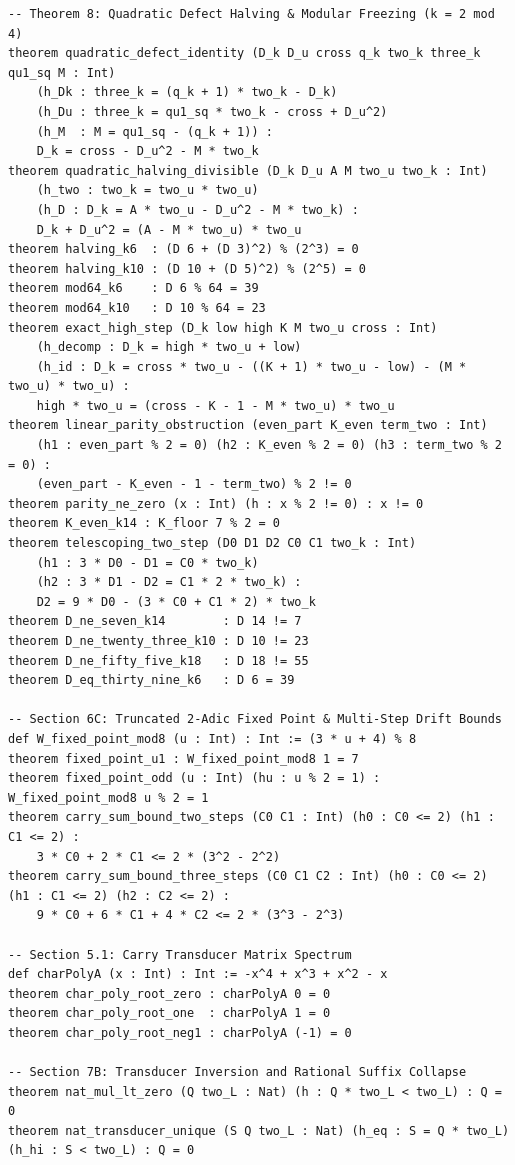 \documentclass[11pt,reqno]{amsart}
\theoremstyle{definition}
\numberwithin{equation}{section}
\begin{document}
\begin{tiny}
\begin{verbatim}
-- Theorem 8: Quadratic Defect Halving & Modular Freezing (k = 2 mod 4)
theorem quadratic_defect_identity (D_k D_u cross q_k two_k three_k qu1_sq M : Int)
    (h_Dk : three_k = (q_k + 1) * two_k - D_k)
    (h_Du : three_k = qu1_sq * two_k - cross + D_u^2)
    (h_M  : M = qu1_sq - (q_k + 1)) :
    D_k = cross - D_u^2 - M * two_k
theorem quadratic_halving_divisible (D_k D_u A M two_u two_k : Int)
    (h_two : two_k = two_u * two_u)
    (h_D : D_k = A * two_u - D_u^2 - M * two_k) :
    D_k + D_u^2 = (A - M * two_u) * two_u
theorem halving_k6  : (D 6 + (D 3)^2) % (2^3) = 0
theorem halving_k10 : (D 10 + (D 5)^2) % (2^5) = 0
theorem mod64_k6    : D 6 % 64 = 39
theorem mod64_k10   : D 10 % 64 = 23
theorem exact_high_step (D_k low high K M two_u cross : Int)
    (h_decomp : D_k = high * two_u + low)
    (h_id : D_k = cross * two_u - ((K + 1) * two_u - low) - (M * two_u) * two_u) :
    high * two_u = (cross - K - 1 - M * two_u) * two_u
theorem linear_parity_obstruction (even_part K_even term_two : Int)
    (h1 : even_part % 2 = 0) (h2 : K_even % 2 = 0) (h3 : term_two % 2 = 0) :
    (even_part - K_even - 1 - term_two) % 2 != 0
theorem parity_ne_zero (x : Int) (h : x % 2 != 0) : x != 0
theorem K_even_k14 : K_floor 7 % 2 = 0
theorem telescoping_two_step (D0 D1 D2 C0 C1 two_k : Int)
    (h1 : 3 * D0 - D1 = C0 * two_k)
    (h2 : 3 * D1 - D2 = C1 * 2 * two_k) :
    D2 = 9 * D0 - (3 * C0 + C1 * 2) * two_k
theorem D_ne_seven_k14        : D 14 != 7
theorem D_ne_twenty_three_k10 : D 10 != 23
theorem D_ne_fifty_five_k18   : D 18 != 55
theorem D_eq_thirty_nine_k6   : D 6 = 39

-- Section 6C: Truncated 2-Adic Fixed Point & Multi-Step Drift Bounds
def W_fixed_point_mod8 (u : Int) : Int := (3 * u + 4) % 8
theorem fixed_point_u1 : W_fixed_point_mod8 1 = 7
theorem fixed_point_odd (u : Int) (hu : u % 2 = 1) : W_fixed_point_mod8 u % 2 = 1
theorem carry_sum_bound_two_steps (C0 C1 : Int) (h0 : C0 <= 2) (h1 : C1 <= 2) :
    3 * C0 + 2 * C1 <= 2 * (3^2 - 2^2)
theorem carry_sum_bound_three_steps (C0 C1 C2 : Int) (h0 : C0 <= 2) (h1 : C1 <= 2) (h2 : C2 <= 2) :
    9 * C0 + 6 * C1 + 4 * C2 <= 2 * (3^3 - 2^3)

-- Section 5.1: Carry Transducer Matrix Spectrum
def charPolyA (x : Int) : Int := -x^4 + x^3 + x^2 - x
theorem char_poly_root_zero : charPolyA 0 = 0
theorem char_poly_root_one  : charPolyA 1 = 0
theorem char_poly_root_neg1 : charPolyA (-1) = 0

-- Section 7B: Transducer Inversion and Rational Suffix Collapse
theorem nat_mul_lt_zero (Q two_L : Nat) (h : Q * two_L < two_L) : Q = 0
theorem nat_transducer_unique (S Q two_L : Nat) (h_eq : S = Q * two_L) (h_hi : S < two_L) : Q = 0
\end{verbatim}
\end{tiny}
\end{document}
